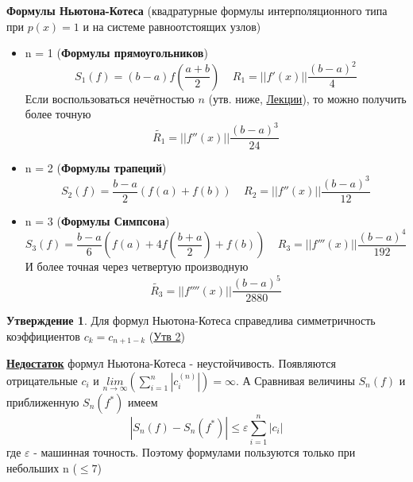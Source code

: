 \documentclass[specialist, subf, href, colorlinks=true, 12pt, times, mtpro, final]{disser}
\theoremstyle{definition}
\newtheorem{state}{Утверждение}[section]
\begin{document}
    \textbf{Формулы Ньютона-Котеса} (квадратурные формулы интерполяционного типа при $p(x) = 1$ и на системе равноотстоящих узлов)
    \begin{itemize}
        \item n = 1 ({\bf Формулы прямоугольников})
        $$
            S_1(f) = (b-a)f\left(\frac{a+b}{2}\right) \ \ \ \ \ R_1 = ||f'(x)||\frac{(b - a)^2}{4}
        $$
        Если воспользоваться нечётностью $n$ (утв. ниже, \hyperlink {lects.39}{Лекции}), то можно получить более точную  
        $$
            \tilde{R_1} = ||f''(x)||\frac{(b-a)^3}{24}
        $$
        \item n = 2 ({\bf Формулы трапеций})
        $$
            S_2(f) = \frac{b - a}{2}(f(a) + f(b)) \ \ \ \ \ R_2 = ||f''(x)||\frac{(b-a)^3}{12}
        $$
        \item n = 3 ({\bf Формулы Симпсона})
        $$
            S_3(f) = \frac{b - a}{6}\left(f(a) + 4f\left(\frac{b+a}{2}\right) + f(b)\right) \ \ \ \ \ R_3 = ||f'''(x)||\frac{(b-a)^4}{192}
        $$
        И более точная через четвертую производную
        $$
            \tilde{R_3} = ||f''''(x)||\frac{(b-a)^5}{2880}
        $$
    \end{itemize}

    \begin{state}
        Для формул Ньютона-Котеса справедлива симметричность коэффициентов $c_k = c_{n+1-k}$ (\hyperlink {lects.40}{Утв 2})
    \end{state}

    \textbf{\hyperlink {lects.39}{Недостаток}} формул Ньютона-Котеса - неустойчивость. Появляются отрицательные $c_i$ и $\underset{n\rightarrow \infty}{lim} \left(\sum\limits_{i=1}^n |c_i^{(n)}| \right) = \infty$. А Сравнивая величины $S_n(f)$ и приближенную $S_n(f^*)$ имеем 
    $$
        |S_n(f) - S_n(f^*)| \le \varepsilon \sum\limits_{i = 1}^n |c_i|
    $$
    где $\varepsilon$ - машинная точность. Поэтому формулами пользуются только при небольших n ($\le7$)
\end{document}
